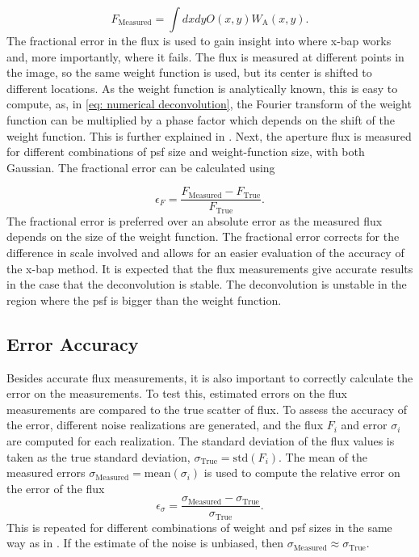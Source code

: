 \begin{equation}
    F_\mathrm{Measured} = \int dxdy O(x,y) W_\mathrm{A}(x,y).
\end{equation}
The fractional error in the flux is used to gain insight into where \gls{x-bap} works and, more importantly, where it fails. The flux is measured at different points in the image, so the same weight function is used, but its center is shifted to different locations. As the weight function is analytically known, this is easy to compute, as, in \autoref{eq: numerical deconvolution}, the Fourier transform of the weight function can be multiplied by a phase factor which depends on the shift of the weight function. This is further explained in .  Next, the aperture flux is measured for different combinations of \gls{psf} size and weight-function size, with both Gaussian. The fractional error can be calculated using

\begin{equation}
    \epsilon_F=\frac{F_\mathrm{Measured}- F_\mathrm{True}}{F_\mathrm{True}}.
\end{equation}
The fractional error is preferred over an absolute error as the measured flux depends on the size of the weight function. The fractional error corrects for the difference in scale involved and allows for an easier evaluation of the accuracy of the \gls{x-bap} method.
It is expected that the flux measurements give accurate results in the case that the deconvolution is stable. The deconvolution is unstable in the region where the \gls{psf} is bigger than the weight function.

\subsection{Error Accuracy}

Besides accurate flux measurements, it is also important to correctly calculate the error on the measurements. To test this, estimated errors on the flux measurements are compared to the true scatter of flux. To assess the accuracy of the error, different noise realizations are generated, and the flux $F_i$ and error $\sigma_i$ are computed for each realization. The standard deviation of the flux values is taken as the true standard deviation, $\sigma_\mathrm{True}=\mathrm{std}(F_i)$. The mean of the measured errors $\sigma_\mathrm{Measured}=\mathrm{mean}(\sigma_i)$ is used to compute the relative error on the error of the flux
\begin{equation}
    \epsilon_\sigma = \frac{\sigma_\mathrm{Measured}- \sigma_\mathrm{True}}{\sigma_\mathrm{True}}.
\end{equation}
This is repeated for different combinations of weight and \gls{psf} sizes in the same way as in . If the estimate of the noise is unbiased, then $\sigma_\mathrm{Measured}\approx\sigma_\mathrm{True}$.

